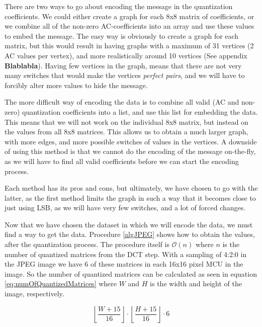 There are two ways to go about encoding the message in the quantization coefficients. 
We could either create a graph for each 8x8 matrix of coefficients, or we combine all of the non-zero AC-coefficients into an array and use these values to embed the message. 
The easy way is obviously to create a graph for each matrix, but this would result in having graphs with a maximum of 31 vertices (2 AC values per vertex), and more realistically around 10 vertices (See appendix \textbf{Blablabla}). 
Having few vertices in the graph, means that there are not very many switches that would make the vertices \textit{perfect pairs}, and we will have to forcibly alter more values to hide the message.

The more difficult way of encoding the data is to combine all valid (AC and non-zero) quantization coefficients into a list, and use this list for embedding the data. 
This means that we will not work on the individual 8x8 matrix, but instead on the values from all 8x8 matrices. 
This allows us to obtain a much larger graph, with more edges, and more possible switches of values in the vertices. 
A downside of using this method is that we cannot do the encoding of the message on-the-fly, as we will have to find all valid coefficients before we can start the encoding process.

Each method has its pros and cons, but ultimately, we have chosen to go with the latter, as the first method limits the graph in such a way that it becomes close to just using LSB, as we will have very few switches, and a lot of forced changes.

Now that we have chosen the dataset in which we will encode the data, we must find a way to get the data. 
Procedure \ref{algJPEG} shows how to obtain the values, after the quantization process. 
The procedure itself is $\mathcal{O}(n)$ where $n$ is the number of quantized matrices from the DCT step. 
With a sampling of 4:2:0 in the JPEG image we have 6 of these matrices in each 16x16 pixel MCU in the image. 
So the number of quantized matrices can be calculated as seen in equation \ref{eq:numOfQuantizedMatrices} where $W$ and $H$ is the width and height of the image, respectively.

\begin{equation}
\label{eq:numOfQuantizedMatrices}
\left \lfloor \frac{W + 15}{16}\right \rfloor \cdot \left \lfloor \frac{H + 15}{16}\right \rfloor \cdot 6
\end{equation}

